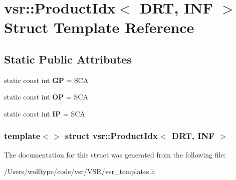 \hypertarget{structvsr_1_1_product_idx_3_01_d_r_t_00_01_i_n_f_01_4}{\section{vsr\-:\-:Product\-Idx$<$ D\-R\-T, I\-N\-F $>$ Struct Template Reference}
\label{structvsr_1_1_product_idx_3_01_d_r_t_00_01_i_n_f_01_4}
}
\subsection*{Static Public Attributes}
\begin{DoxyCompactItemize}
\item 
\hypertarget{structvsr_1_1_product_idx_3_01_d_r_t_00_01_i_n_f_01_4_a55b44d53349b89649751a306d84349cc}{static const int {\bfseries G\-P} = S\-C\-A}\label{structvsr_1_1_product_idx_3_01_d_r_t_00_01_i_n_f_01_4_a55b44d53349b89649751a306d84349cc}

\item 
\hypertarget{structvsr_1_1_product_idx_3_01_d_r_t_00_01_i_n_f_01_4_a76ca3e30e7c4e019d8a460a27c99b8d7}{static const int {\bfseries O\-P} = S\-C\-A}\label{structvsr_1_1_product_idx_3_01_d_r_t_00_01_i_n_f_01_4_a76ca3e30e7c4e019d8a460a27c99b8d7}

\item 
\hypertarget{structvsr_1_1_product_idx_3_01_d_r_t_00_01_i_n_f_01_4_ab02c023d33e5eca9df06a6c46a181e89}{static const int {\bfseries I\-P} = S\-C\-A}\label{structvsr_1_1_product_idx_3_01_d_r_t_00_01_i_n_f_01_4_ab02c023d33e5eca9df06a6c46a181e89}

\end{DoxyCompactItemize}
\subsubsection*{template$<$$>$ struct vsr\-::\-Product\-Idx$<$ D\-R\-T, I\-N\-F $>$}



The documentation for this struct was generated from the following file\-:\begin{DoxyCompactItemize}
\item 
/\-Users/wolftype/code/vsr/\-V\-S\-R/vsr\-\_\-templates.\-h\end{DoxyCompactItemize}
